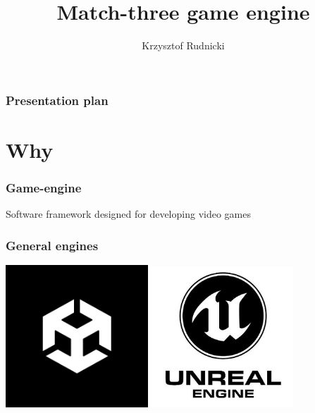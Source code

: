 \documentclass{beamer}
\title{Match-three game engine}
\author{Krzysztof Rudnicki}
\begin{document}
\frame{\titlepage}

\begin{frame}
\frametitle{Presentation plan}
\tableofcontents
\end{frame}

\section{Why}
\begin{frame}
    \frametitle{Game-engine}
    Software framework designed for developing video games
    \end{frame}

    \begin{frame}
        \frametitle{General engines}
        \includegraphics[width=0.4\textwidth]{unity.jpg}
        \includegraphics[width=0.4\textwidth]{unreal}
        \end{frame}
\end{document}
